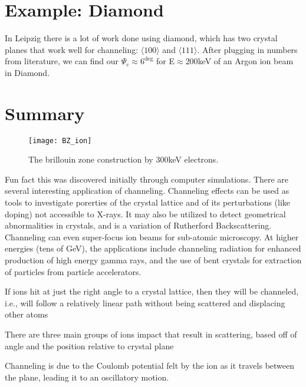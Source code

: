 \section{Example: Diamond}\label{sec:example:-diamond}
In Leipzig there is a lot of work done using diamond, which has two crystal planes that work well for channeling: $\langle 100 \rangle$ and $\langle 111 \rangle $.
After plugging in numbers from literature, we can find our $\Psi_c \approx 6^{\deg} $ for E$\approx 200$keV of an Argon ion beam in Diamond.
\section{Summary}\label{sec:summary6}
\begin{wrapfigure}{r}{0.5\textwidth}
	\centering
	\texttt{[image: BZ\_ion]}
	\caption{The brillouin zone construction by 300keV electrons. }
\end{wrapfigure}
Fun fact this was discovered initially through computer simulations.
There are several interesting application of channeling.
Channeling effects can be used as tools to investigate porerties of the crystal lattice and of its perturbations (like doping) not accessible to X-rays.
It may also be utilized to detect geometrical abnormalities in crystals, and is a variation of Rutherford Backscattering.
Channeling can even super-focus ion beams for sub-atomic microscopy.
At higher energies (tens of GeV), the applications include channeling radiation for enhanced production of high energy gamma rays, and the use of bent crystals for extraction of particles from particle accelerators.

\begin{myitemize}
	\item If ions hit at just the right angle to a crystal lattice, then they will be channeled, i.e., will follow a relatively linear path without being scattered and displacing other atoms
	\item There are three main groups of ions impact that result in scattering, based off of angle and the position relative to crystal plane
	\item Channeling is due to the Coulomb potential felt by the ion as it travels between the plane, leading it to an oscillatory motion.
\end{myitemize}
